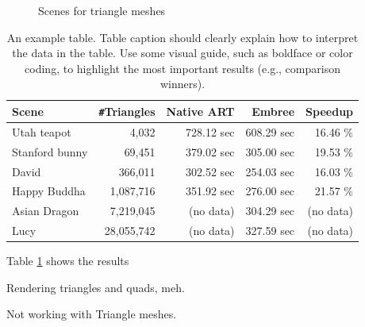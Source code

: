 \begin{figure}
	\hfill
	
	\caption{Scenes for triangle meshes}
	\label{fig:mesh_scenes}
\end{figure}

\begin{table}
	\centering
	{\footnotesize\sf
		\begin{tabular}{lrrrr}
			\toprule
			Scene & \Verb!#!Triangles & Native ART & Embree & Speedup \\ 
			\midrule
			Utah teapot & 4,032 & 728.12 sec & 608.29 sec & 16.46 \% \\
			Stanford bunny & 69,451 & 379.02 sec & 305.00 sec & 19.53 \% \\
			David & 366,011 & 302.52 sec & 254.03 sec & 16.03 \%  \\
			\addlinespace %
			Happy Buddha & 1,087,716 & 351.92 sec & 276.00 sec & 21.57 \% \\
			Asian Dragon & 7,219,045 & (no data) & 304.29 sec & (no data)  \\
			Lucy & 28,055,742 & (no data) & 327.59 sec & (no data)  \\
			\bottomrule
	\end{tabular}}
	\caption{An example table. Table caption should clearly explain how to interpret the data in the table. Use some visual guide, such as boldface or color coding, to highlight the most important results (e.g., comparison winners).}
	\label{tab:mesh}
\end{table}

Table \ref{tab:mesh} shows the results




Rendering triangles and quads, meh.

Not working with Triangle meshes.

